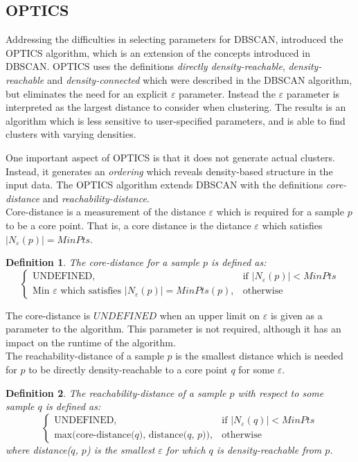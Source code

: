 \documentclass[a4paper]{report}
\newtheorem*{definition}{Definition}
\begin{document}
\subsection{OPTICS}
Addressing the difficulties in selecting parameters for DBSCAN,
\citet{ankerst99} introduced the OPTICS algorithm, which is an extension of
the concepts introduced in DBSCAN. OPTICS uses the definitions
\emph{directly density-reachable}, \emph{density-reachable} and
\emph{density-connected} which were described in the DBSCAN algorithm, but
eliminates the need for an explicit $\varepsilon$ parameter. Instead the
$\varepsilon$ parameter is interpreted as the largest distance to consider
when clustering. The results is an algorithm which is less sensitive to
user-specified parameters, and is able to find clusters with varying densities.

One important aspect of OPTICS is that it does not generate actual clusters.
Instead, it generates an \emph{ordering} which reveals density-based structure
in the input data. The OPTICS algorithm extends DBSCAN with the definitions
\emph{core-distance} and \emph{reachability-distance}.
\\[0.5cm]
Core-distance is a measurement of the distance $\varepsilon$ which is required
for a sample $p$ to be a core point. That is, a core distance is the distance
$\varepsilon$ which satisfies $|N_{\varepsilon}(p)| = MinPts$.

\begin{definition}
    The core-distance for a sample $p$ is defined as:
\[
    \begin{cases}
        \text{UNDEFINED}, & \text{if $|N_{\varepsilon}(p)| < MinPts$}\\
        \text{Min $\varepsilon$ which satisfies  $|N_{\varepsilon}(p)| = MinPts$}(p), & \text{otherwise}
    \end{cases}
\]
\end{definition}

The core-distance is $UNDEFINED$ when an upper limit on $\varepsilon$ is
given as a parameter to the algorithm. This parameter is not required,
although it has an impact on the runtime of the algorithm.
\\[0.5cm]
The reachability-distance of a sample $p$ is the smallest distance which is
needed for $p$ to be directly density-reachable to a core point $q$ for some
$\varepsilon$. 

\begin{definition}
    The reachability-distance of a sample $p$ with respect to some sample $q$
    is defined as:
\[
    \begin{cases}
        \text{UNDEFINED}, & \text{if $|N_{\varepsilon}(q)| < MinPts$}\\
        \text{max(core-distance($q$), distance($q$, $p$))}, & \text{otherwise}
    \end{cases}
\]
    where distance($q$, $p$) is the smallest $\varepsilon$ for which $q$ is
    density-reachable from $p$.
\end{definition}
\end{document}

